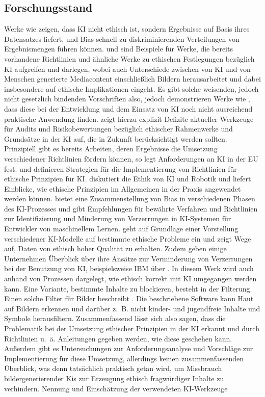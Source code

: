 \subsection{Forschungsstand}
Werke wie \cite{Salminen} zeigen, dass KI nicht ethisch ist, sondern Ergebnisse auf Basis ihres Datensatzes liefert,
und Bias schnell zu diskriminierenden Verteilungen von Ergebnismengen führen können. \cite{Jobin} und \cite{Partadiredja}
sind Beispiele für Werke, die bereits vorhandene Richtlinien und ähnliche Werke zu ethischen Festlegungen bezüglich KI 
aufgreifen und darlegen, wobei \cite{Partadiredja} auch Unterschiede zwischen von KI und von Menschen generierte 
Mediacontent einschließlich Bildern herausarbeitet und dabei insbesondere auf ethische Implikationen eingeht. 
Es gibt solche weisenden, jedoch nicht gesetzlich bindenden Vorschriften also, jedoch demonstrieren Werke wie 
\cite{Ayling}, dass diese bei der Entwicklung und dem Einsatz von KI noch nicht ausreichend praktische Anwendung 
finden. \cite{Ayling} zeigt hierzu explizit Defizite aktueller Werkzeuge für Audits und Risikobewertungen bezüglich 
ethischer Rahmenwerke und Grundsätze in der KI auf, die in Zukunft berücksichtigt werden sollten. 
Prinzipiell gibt es bereits Arbeiten, deren Ergebnisse die Umsetzung verschiedener Richtlinien fördern können, so legt 
\cite{EUCommision} Anforderungen an KI in der EU fest. \cite{Jobin} und \cite{Hagendorff} definieren Strategien 
für die Implementierung von Richtlinien für ethische Prinzipien für KI. \cite{Stahl} diskutiert die Ethik von KI und Robotik 
und liefert Einblicke, wie ethische Prinzipien im Allgemeinen in der Praxis angewendet werden können. \cite{Srinivasan} bietet 
eine Zusammenstellung von Bias in verschiedenen Phasen des KI-Prozesses und gibt Empfehlungen für bewährte Verfahren und 
Richtlinien zur Identifizierung und Minderung von Verzerrungen in KI-Systemen für Entwickler von maschinellem Lernen. \cite{Jameel} 
geht auf Grundlage einer Vorstellung verschiedener KI-Modelle auf bestimmte ethische Probleme ein und zeigt Wege auf, 
Daten von ethisch hoher Qualität zu erhalten.
Zudem geben einige Unternehmen Überblick über ihre Ansätze zur Verminderung von Verzerrungen bei der Benutzung von KI, 
beispielsweise IBM über \cite{Hobson}. In diesem Werk wird auch anhand von Prozessen dargelegt, wie ethisch korrekt mit KI 
umgegangen werden kann.
Eine Variante, bestimmte Inhalte zu blockieren, besteht in der Filterung. Einen solche Filter für Bilder beschreibt \cite{Zheng}.
Die beschriebene Software kann Haut auf Bildern erkennen und darüber z. B. nicht kinder- und jugendfreie Inhalte und Symbole herausfiltern.
Zusammenfassend lässt sich also sagen, dass die Problematik bei der Umsetzung ethischer Prinzipien in der KI erkannt und
durch Richtlinien u. ä. Anleitungen gegeben werden, wie diese geschehen kann. Außerdem gibt es Untersuchungen 
zur Anforderungsanalyse und Vorschläge zur Implementierung für diese Umsetzung, allerdings keinen zusammenfassenden 
Überblick, was denn tatsächlich praktisch getan wird, um Missbrauch bildergenerierender Kis zur Erzeugung ethisch 
fragwürdiger Inhalte zu verhindern.
Nennung und Einschätzung der verwendeten KI-Werkzeuge

